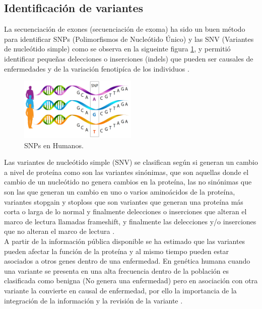 \subsection{Identificación de variantes}

La secuenciación de exones (secuenciación de exoma) ha sido un buen método para identificar SNPs (Polimorfismos de Nucleótido Único) y las SNV (Variantes de nucleótido simple) como se observa en la sigueinte figura \ref{fig:snp}, y permitió identificar pequeñas delecciones o inserciones (indels) que pueden  ser  causales de enfermedades y de la variación fenotipíca de los individuos \cite{Deng2011,Wenger2017}.\\

\begin{figure}[h!] 
	\centering
	\includegraphics[width=0.5\textwidth]{Estado/snp}
	\caption{SNPs en Humanos.} \label{fig:snp}
\end{figure}

Las variantes de nucleótido simple (SNV) se clasifican según si generan un cambio a nivel de proteína como son las variantes sinónimas, que son aquellas donde el cambio de un nucleótido no genera cambios en la proteína, las no sinónimas que son las que generan un cambio en uno o varios aminoácidos de la proteína, variantes stopgain y stoploss que son variantes que generan una proteína más corta o larga de lo normal y finalmente delecciones o inserciones que alteran el marco de lectura llamadas frameshift, y finalmente las delecciones y/o inserciones que no alteran el marco de lectura \cite{Liu2016}.\\   

A partir de la información pública disponible se ha estimado que las variantes pueden afectar la función de la proteína y al mismo tiempo pueden estar asociados a otros genes dentro de una enfermedad. En genética humana cuando una variante se presenta en una alta frecuencia dentro de la población es clasificada como benigna (No genera una enfermedad) pero en asociación con otra variante la convierte en causal de enfermedad, por ello la importancia de la integración de la información y la revisión de la variante \cite{Shendure2016}.\\

